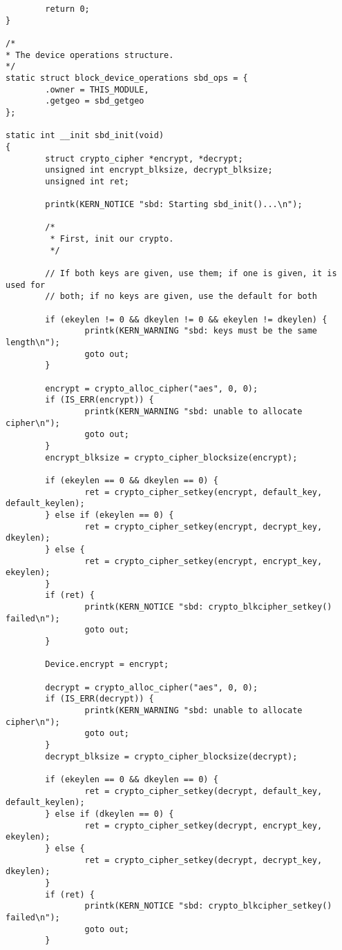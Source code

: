 \documentclass[letterpaper,10pt,titlepage,draftclsnofoot,onecolumn]{article}
\begin{document}
\begin{lstlisting}
        return 0;
}

/*
* The device operations structure.
*/
static struct block_device_operations sbd_ops = {
        .owner = THIS_MODULE,
        .getgeo = sbd_getgeo
};

static int __init sbd_init(void)
{
        struct crypto_cipher *encrypt, *decrypt;
        unsigned int encrypt_blksize, decrypt_blksize;
        unsigned int ret;

        printk(KERN_NOTICE "sbd: Starting sbd_init()...\n");

        /*
         * First, init our crypto.
         */

        // If both keys are given, use them; if one is given, it is used for
        // both; if no keys are given, use the default for both

        if (ekeylen != 0 && dkeylen != 0 && ekeylen != dkeylen) {
                printk(KERN_WARNING "sbd: keys must be the same length\n");
                goto out;
        }

        encrypt = crypto_alloc_cipher("aes", 0, 0);
        if (IS_ERR(encrypt)) {
                printk(KERN_WARNING "sbd: unable to allocate cipher\n");
                goto out;
        }
        encrypt_blksize = crypto_cipher_blocksize(encrypt);

        if (ekeylen == 0 && dkeylen == 0) {
                ret = crypto_cipher_setkey(encrypt, default_key, default_keylen);
        } else if (ekeylen == 0) {
                ret = crypto_cipher_setkey(encrypt, decrypt_key, dkeylen);
        } else {
                ret = crypto_cipher_setkey(encrypt, encrypt_key, ekeylen);
        }
        if (ret) {
                printk(KERN_NOTICE "sbd: crypto_blkcipher_setkey() failed\n");
                goto out;
        }

        Device.encrypt = encrypt;

        decrypt = crypto_alloc_cipher("aes", 0, 0);
        if (IS_ERR(decrypt)) {
                printk(KERN_WARNING "sbd: unable to allocate cipher\n");
                goto out;
        }
        decrypt_blksize = crypto_cipher_blocksize(decrypt);

        if (ekeylen == 0 && dkeylen == 0) {
                ret = crypto_cipher_setkey(decrypt, default_key, default_keylen);
        } else if (dkeylen == 0) {
                ret = crypto_cipher_setkey(decrypt, encrypt_key, ekeylen);
        } else {
                ret = crypto_cipher_setkey(decrypt, decrypt_key, dkeylen);
        }
        if (ret) {
                printk(KERN_NOTICE "sbd: crypto_blkcipher_setkey() failed\n");
                goto out;
        }


\end{lstlisting}
\end{document}
